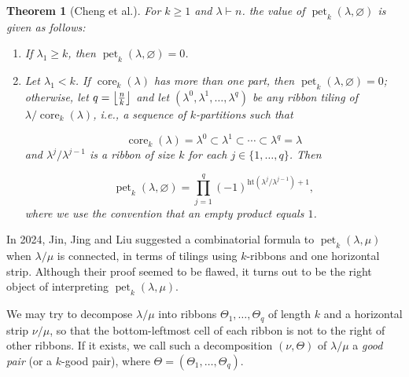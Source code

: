 \documentclass[pdflatex,sn-mathphys-num]{sn-jnl}%
\theoremstyle{thmstyleone}%
\newtheorem{theorem}{Theorem}[section]
\theoremstyle{thmstyletwo}%
\theoremstyle{thmstylethree}%
\numberwithin{equation}{section}
\DeclarePairedDelimiter{\floor}{\lfloor}{\rfloor}
\DeclareMathOperator{\pet}{pet}
\DeclareMathOperator{\core}{core}
\DeclareMathOperator{\htt}{ht}
\begin{document}
	\begin{theorem}%
[Cheng et al.\cite{cheng2022signedmultiplicitiesschurexpansions}]
		\label{thm:Cheng-unused}
		For $k\geq 1$ and $\lambda \vdash n$. the value of $\pet_k(\lambda,\varnothing)$ is given as follows:
		\begin{enumerate}
			\item If $\lambda_{1} \geq k$, then $\pet_k(\lambda,\varnothing)=0$.
			\item Let $\lambda_{1}<k$. If $\core_{k}(\lambda)$ has more than one part, then $\pet_k(\lambda,\varnothing)=0$; 
            otherwise, let $q=\floor*{\frac{n}{k}}$ and let $(\lambda^{0}, \lambda^{1}, \ldots, \lambda^{q})$ be any ribbon tiling of $\lambda/\core_k(\lambda)$, i.e., a sequence of $k$-partitions such that
		
			\[\operatorname{core}_{k}(\lambda)=\lambda^{0} \subset \lambda^{1} \subset \cdots \subset \lambda^{q}=\lambda\]
			and $\lambda^{j} / \lambda^{j-1}$ is a ribbon of size $k$ for each $j \in\{1, \ldots, q\}$. Then
			
			\[
			\operatorname{pet}_{k}(\lambda,\varnothing)=\prod_{j=1}^{q}(-1)^{\mathrm{ht}\left(\lambda^{j} / \lambda^{j-1}\right)+1},
			\]
			where we use the convention that an empty product equals $1$.
		\end{enumerate}
	\end{theorem}
	
    In 2024, Jin, Jing and Liu \cite{jin2024pierilikerulepetriesymmetric} suggested a combinatorial formula to $\pet_k(\lambda,\mu)$ when $\lambda/\mu$ is connected, in terms of tilings using $k$-ribbons and one horizontal strip. Although their proof seemed to be flawed, it turns out to be the right object of interpreting $\pet_k(\lambda,\mu)$.
    
	
    We may try to decompose $\lambda/\mu$ into ribbons $\Theta_1,\dotsc,\Theta_q$ of length $k$ and a horizontal strip $\nu/\mu$, so that the bottom-leftmost cell of each ribbon is not to the right of other ribbons. 
    If it exists, we call such a decomposition $(\nu,\Theta)$ of $\lambda/\mu$ a \emph{good pair} (or a $k$-good pair), where $\Theta=(\Theta_1,\dotsc,\Theta_q)$. 

\end{document}
